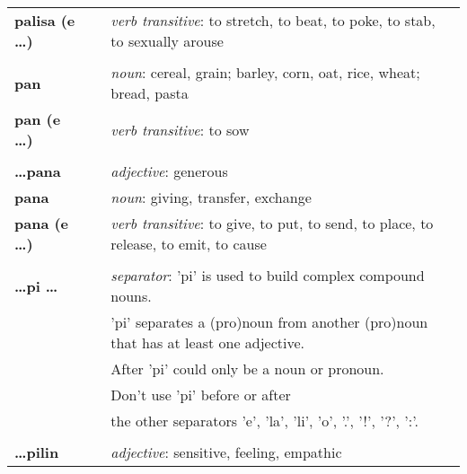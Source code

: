 \begin{supertabular}{p{2,5cm}|ll}
    \textbf{palisa (e \dots)}    &  & \textit{verb transitive}: to stretch, to beat, to poke, to stab, to sexually arouse                        \\
                                 &  &                                                                                                            \\ %
    \textbf{pan}                 &  & \textit{noun}: cereal, grain; barley, corn, oat, rice, wheat; bread, pasta                                 \\
    \textbf{pan (e \dots)}       &  & \textit{verb transitive}: to sow                                                                           \\
                                 &  &                                                                                                            \\ %
    \textbf{\dots pana}          &  & \textit{adjective}: generous                                                                               \\
    \textbf{pana}                &  & \textit{noun}: giving, transfer, exchange                                                                  \\
    \textbf{pana (e \dots)}      &  & \textit{verb transitive}: to give, to put, to send, to place, to release, to emit, to cause                \\
                                 &  &                                                                                                            \\ %
    \textbf{\dots pi \dots }     &  & \textit{separator}: 'pi' is used to build complex compound nouns.                                          \\ && 'pi' separates a (pro)noun from another (pro)noun that has at least one adjective. \\ && After 'pi' could only be a noun or pronoun. \\ && Don't use 'pi' before or after \\ && the other separators 'e', 'la', 'li', 'o', '.', '!', '?', ':'.  \\
                                 &  &                                                                                                            \\ %
    \textbf{\dots pilin}         &  & \textit{adjective}: sensitive, feeling, empathic                                                           \\

\end{supertabular}
